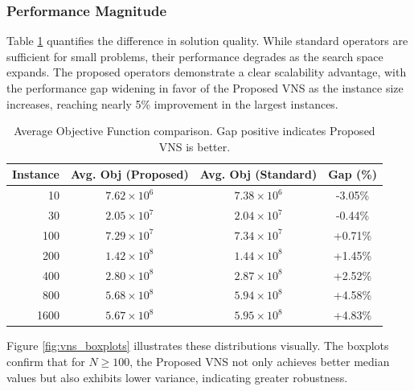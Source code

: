 \documentclass[preprint,12pt,authoryear]{elsarticle}
\begin{document}
\subsubsection{Performance Magnitude}
Table \ref{tab:performance_vns} quantifies the difference in solution quality. While standard operators are sufficient for small problems, their performance degrades as the search space expands. 
The proposed operators demonstrate a clear scalability advantage, with the performance gap widening in favor of the Proposed VNS as the instance size increases, reaching nearly 5\% improvement 
in the largest instances.

\begin{table}[h]
    \centering
    \caption{Average Objective Function comparison. Gap positive indicates Proposed VNS is better.}
    \label{tab:performance_vns}
    \begin{tabular}{rccc}
        \toprule
        Instance & Avg. Obj (Proposed) & Avg. Obj (Standard) & Gap (\%) \\
        \midrule
        10 & $7.62 \times 10^6$ & $7.38 \times 10^6$ & -3.05\% \\
        30 & $2.05 \times 10^7$ & $2.04 \times 10^7$ & -0.44\% \\
        100 & $7.29 \times 10^7$ & $7.34 \times 10^7$ & +0.71\% \\
        200 & $1.42 \times 10^8$ & $1.44 \times 10^8$ & +1.45\% \\
        400 & $2.80 \times 10^8$ & $2.87 \times 10^8$ & +2.52\% \\
        800 & $5.68 \times 10^8$ & $5.94 \times 10^8$ & +4.58\% \\
        1600 & $5.67 \times 10^8$ & $5.95 \times 10^8$ & +4.83\% \\
        \bottomrule
    \end{tabular}
\end{table}

Figure \ref{fig:vns_boxplots} illustrates these distributions visually. The boxplots confirm that for $N \ge 100$, the Proposed VNS not only achieves better median values but also exhibits 
lower variance, indicating greater robustness.
\end{document}
